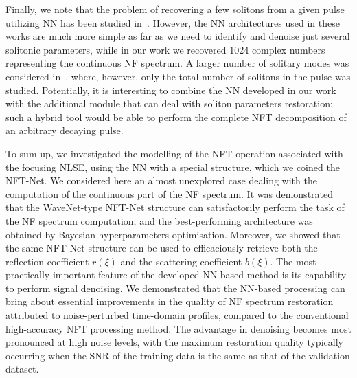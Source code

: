 Finally, we note that the problem of recovering a few solitons from a given pulse utilizing NN has been studied in~\cite{jgy18,ymm19,wxz20,mishina2021eigenvalue}. However, the NN architectures used in these works are much more simple as far as we need to identify and denoise just several solitonic parameters, while in our work we recovered 1024 complex numbers representing the continuous NF spectrum. A larger number of solitary modes was considered in~\cite{sedov2020application}, where, however, only the total number of solitons in the pulse was studied. 
Potentially, it is interesting to combine the NN developed in our work with the additional module that can deal with soliton parameters restoration: such a hybrid tool would be able to perform the complete NFT decomposition of an arbitrary decaying pulse. %

To sum up, we investigated the modelling of the NFT operation associated with the focusing NLSE, using the NN with a special structure, which we coined the NFT-Net. We considered here an almost unexplored case dealing with the computation of the continuous part of the NF spectrum. It was demonstrated that the WaveNet-type NFT-Net structure can satisfactorily perform the task of the NF spectrum computation, and the best-performing architecture was obtained by Bayesian hyperparameters optimisation. Moreover, we showed that the same NFT-Net structure can be used to efficaciously retrieve both the reflection coefficient $r(\xi)$ and the scattering coefficient $b(\xi)$. The most practically important feature of the developed NN-based method is its capability to perform signal denoising.  We demonstrated that the NN-based processing can bring about essential improvements in the quality of NF spectrum restoration attributed to noise-perturbed time-domain profiles, compared to the conventional high-accuracy NFT processing method. The advantage in denoising becomes most pronounced at high noise levels, with the maximum restoration quality typically occurring when the SNR of the training data is the same as that of the validation dataset. 
